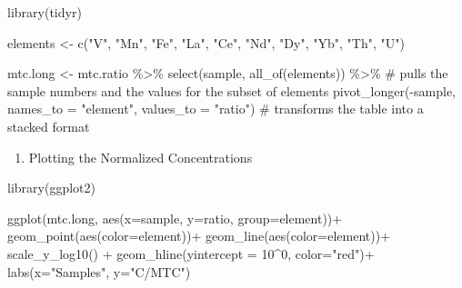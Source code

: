 \documentclass[
  letterpaper,
  DIV=11,
  numbers=noendperiod]{scrreprt}
\newenvironment{Shaded}{\begin{snugshade}}{\end{snugshade}}
\newcommand{\AttributeTok}[1]{\textcolor[rgb]{0.40,0.45,0.13}{#1}}
\newcommand{\CommentTok}[1]{\textcolor[rgb]{0.37,0.37,0.37}{#1}}
\newcommand{\DecValTok}[1]{\textcolor[rgb]{0.68,0.00,0.00}{#1}}
\newcommand{\FunctionTok}[1]{\textcolor[rgb]{0.28,0.35,0.67}{#1}}
\newcommand{\NormalTok}[1]{\textcolor[rgb]{0.00,0.23,0.31}{#1}}
\newcommand{\OtherTok}[1]{\textcolor[rgb]{0.00,0.23,0.31}{#1}}
\newcommand{\SpecialCharTok}[1]{\textcolor[rgb]{0.37,0.37,0.37}{#1}}
\newcommand{\StringTok}[1]{\textcolor[rgb]{0.13,0.47,0.30}{#1}}
\providecommand{\tightlist}{%
  \setlength{\itemsep}{0pt}\setlength{\parskip}{0pt}}
\begin{document}
\begin{Shaded}
\begin{Highlighting}[]
\FunctionTok{library}\NormalTok{(tidyr)}

\NormalTok{elements }\OtherTok{\textless{}{-}} \FunctionTok{c}\NormalTok{(}\StringTok{"V"}\NormalTok{, }\StringTok{"Mn"}\NormalTok{, }\StringTok{"Fe"}\NormalTok{, }\StringTok{"La"}\NormalTok{, }\StringTok{"Ce"}\NormalTok{, }\StringTok{"Nd"}\NormalTok{, }\StringTok{"Dy"}\NormalTok{, }\StringTok{"Yb"}\NormalTok{, }\StringTok{"Th"}\NormalTok{, }\StringTok{"U"}\NormalTok{)}

\NormalTok{mtc.long }\OtherTok{\textless{}{-}}\NormalTok{ mtc.ratio }\SpecialCharTok{\%\textgreater{}\%}
  \FunctionTok{select}\NormalTok{(sample, }\FunctionTok{all\_of}\NormalTok{(elements)) }\SpecialCharTok{\%\textgreater{}\%} 
  \CommentTok{\# pulls the sample numbers and the values for the subset of elements}
  \FunctionTok{pivot\_longer}\NormalTok{(}\SpecialCharTok{{-}}\NormalTok{sample, }\AttributeTok{names\_to =} \StringTok{"element"}\NormalTok{, }\AttributeTok{values\_to =} \StringTok{"ratio"}\NormalTok{) }
  \CommentTok{\# transforms the table into a stacked format}
\end{Highlighting}
\end{Shaded}

\begin{enumerate}
\def\labelenumi{\arabic{enumi}.}
\setcounter{enumi}{3}
\tightlist
\item
  Plotting the Normalized Concentrations
\end{enumerate}

\begin{Shaded}
\begin{Highlighting}[]
\FunctionTok{library}\NormalTok{(ggplot2)}

\FunctionTok{ggplot}\NormalTok{(mtc.long, }\FunctionTok{aes}\NormalTok{(}\AttributeTok{x=}\NormalTok{sample, }\AttributeTok{y=}\NormalTok{ratio, }\AttributeTok{group=}\NormalTok{element))}\SpecialCharTok{+}
  \FunctionTok{geom\_point}\NormalTok{(}\FunctionTok{aes}\NormalTok{(}\AttributeTok{color=}\NormalTok{element))}\SpecialCharTok{+}
  \FunctionTok{geom\_line}\NormalTok{(}\FunctionTok{aes}\NormalTok{(}\AttributeTok{color=}\NormalTok{element))}\SpecialCharTok{+}
  \FunctionTok{scale\_y\_log10}\NormalTok{() }\SpecialCharTok{+}
  \FunctionTok{geom\_hline}\NormalTok{(}\AttributeTok{yintercept =} \DecValTok{10}\SpecialCharTok{\^{}}\DecValTok{0}\NormalTok{, }\AttributeTok{color=}\StringTok{"red"}\NormalTok{)}\SpecialCharTok{+}
  \FunctionTok{labs}\NormalTok{(}\AttributeTok{x=}\StringTok{"Samples"}\NormalTok{, }\AttributeTok{y=}\StringTok{"C/MTC"}\NormalTok{)}
\end{Highlighting}
\end{Shaded}
\end{document}
